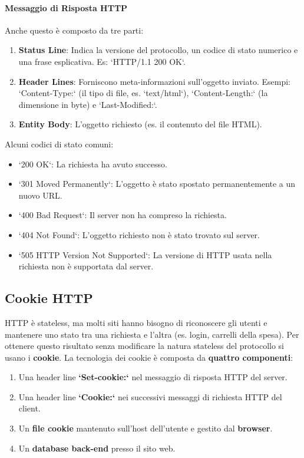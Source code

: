 
\paragraph{Messaggio di Risposta HTTP}
Anche questo è composto da tre parti:
\begin{enumerate}
    \item \textbf{Status Line}: Indica la versione del protocollo, un codice di stato numerico e una frase esplicativa. Es: `HTTP/1.1 200 OK`.
    \item \textbf{Header Lines}: Forniscono meta-informazioni sull'oggetto inviato. Esempi: `Content-Type:` (il tipo di file, es. `text/html`), `Content-Length:` (la dimensione in byte) e `Last-Modified:`.
    \item \textbf{Entity Body}: L'oggetto richiesto (es. il contenuto del file HTML).
\end{enumerate}

Alcuni codici di stato comuni:
\begin{itemize}
    \item `200 OK`: La richiesta ha avuto successo.
    \item `301 Moved Permanently`: L'oggetto è stato spostato permanentemente a un nuovo URL.
    \item `400 Bad Request`: Il server non ha compreso la richiesta.
    \item `404 Not Found`: L'oggetto richiesto non è stato trovato sul server.
    \item `505 HTTP Version Not Supported`: La versione di HTTP usata nella richiesta non è supportata dal server.
\end{itemize}

\subsection{Cookie HTTP}
HTTP è stateless, ma molti siti hanno bisogno di riconoscere gli utenti e mantenere uno stato tra una richiesta e l'altra (es. login, carrelli della spesa). Per ottenere questo risultato senza modificare la natura stateless del protocollo si usano i \textbf{cookie}. La tecnologia dei cookie è composta da \textbf{quattro componenti}:
\begin{enumerate}
    \item Una header line \textbf{`Set-cookie:`} nel messaggio di risposta HTTP del server.
    \item Una header line \textbf{`Cookie:`} nei successivi messaggi di richiesta HTTP del client.
    \item Un \textbf{file cookie} mantenuto sull'host dell'utente e gestito dal \textbf{browser}.
    \item Un \textbf{database back-end} presso il sito web.
\end{enumerate}

